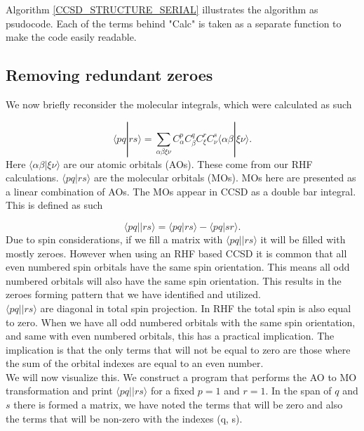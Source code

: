 Algorithm \ref{CCSD_STRUCTURE_SERIAL} illustrates the algorithm as psudocode. Each of the terms behind "Calc" is taken as a separate function to make the code easily readable. 

\subsection{Removing redundant zeroes \label{compact_storage}}
We now briefly reconsider the molecular integrals, which were calculated as such

\begin{equation}
\langle pq|rs \rangle = 
\sum_{\alpha \beta \xi \nu} C_{\alpha}^p C_{\beta}^q C_{\xi}^r C_{\nu}^s \langle \alpha \beta | \xi \nu \rangle .
\end{equation}
Here $\langle \alpha \beta | \xi \nu \rangle$ are our atomic orbitals (AOs). These come from our RHF calculations. $\langle pq|rs \rangle$ are the molecular orbitals (MOs). MOs here are presented as a linear combination of AOs. The MOs appear in CCSD as a double bar integral. This is defined as such

\begin{equation}
\langle pq||rs \rangle = \langle pq | rs \rangle
- \langle pq | sr \rangle  .
\end{equation}
Due to spin considerations, if we fill a matrix with $\langle pq||rs \rangle$ it will be filled with mostly zeroes. However when using an RHF based CCSD it is common that all even numbered spin orbitals have the same spin orientation. This means all odd numbered orbitals will also have the same spin orientation. This results in the zeroes forming pattern that we have identified and utilized. \\

$\langle pq || rs \rangle$ are diagonal in total spin projection. In RHF the total spin is also equal to zero. When we have all odd numbered orbitals with the same spin orientation, and same with even numbered orbitals, this has a practical implication. The implication is that the only terms that will not be equal to zero are those where the sum of the orbital indexes are equal to an even number. \\

We will now visualize this. We construct a program that performs the AO to MO transformation and print $\langle pq||rs \rangle$ for a fixed $p=1$ and $r=1$. In the span of $q$ and $s$ there is formed a matrix, we have noted the terms that will be zero and also the terms that will be non-zero with the indexes (q, s).


